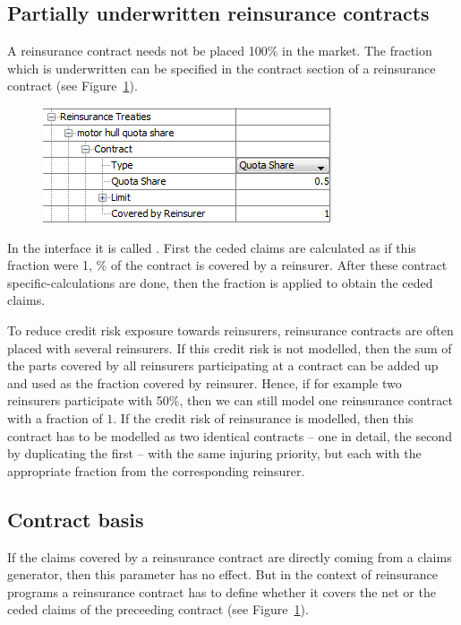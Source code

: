 \subsection{Partially underwritten reinsurance contracts}

A reinsurance contract needs not be placed 100\% in the market. The fraction which is underwritten can be specified in the contract section of a reinsurance contract (see Figure~\ref{fig:coveredByReins}). 
\begin{figure}
		\centering
		\includegraphics{images/coveredByReins.png}
	\caption{}
	\label{fig:coveredByReins}
\end{figure}
In the interface it is called . First the ceded claims are calculated as if this fraction were 1, \% of the contract is covered by a reinsurer. After these contract specific-calculations are done, then the fraction is applied to obtain the ceded claims.

To reduce credit risk exposure towards reinsurers{}, reinsurance contracts are often placed with several reinsurers. If this credit risk is not modelled, then the sum of the parts covered by all reinsurers participating at a contract can be added up and used as the fraction covered by reinsurer. Hence, if for example two reinsurers participate with 50\%, then we can still model one reinsurance contract with a fraction of $1$. If the credit risk of reinsurance is modelled, then this contract has to be modelled as two identical contracts -- one in detail, the second by duplicating the first -- with the same injuring priority, but each with the appropriate fraction from the corresponding reinsurer.

\subsection{Contract basis}

If the claims covered by a reinsurance contract are directly coming from a claims generator, then this parameter has no effect. But in the context of reinsurance programs a reinsurance contract has to define whether it covers the net or the ceded claims of the preceeding contract (see Figure~\ref{fig:coveredByReins}). 

